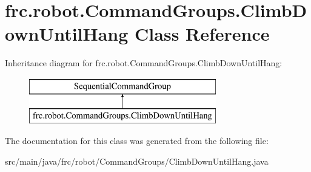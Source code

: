 \hypertarget{classfrc_1_1robot_1_1_command_groups_1_1_climb_down_until_hang}{}\section{frc.\+robot.\+Command\+Groups.\+Climb\+Down\+Until\+Hang Class Reference}
\label{classfrc_1_1robot_1_1_command_groups_1_1_climb_down_until_hang}
Inheritance diagram for frc.\+robot.\+Command\+Groups.\+Climb\+Down\+Until\+Hang\+:\begin{figure}[H]
\begin{center}
\leavevmode
\includegraphics[height=2.000000cm]{classfrc_1_1robot_1_1_command_groups_1_1_climb_down_until_hang}
\end{center}
\end{figure}


The documentation for this class was generated from the following file\+:\begin{DoxyCompactItemize}
\item 
src/main/java/frc/robot/\+Command\+Groups/Climb\+Down\+Until\+Hang.\+java\end{DoxyCompactItemize}
